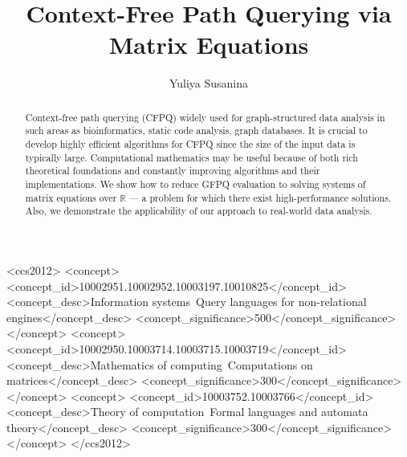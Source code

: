 \documentclass[sigconf]{acmart}
\begin{document}
\fancyhead{}

\title{Context-Free Path Querying via Matrix Equations}

\author{Yuliya Susanina}





\begin{abstract}
  Context-free path querying (CFPQ) widely used for graph-structured data analysis in such areas as bioinformatics, static code analysis, graph databases.
  It is crucial to develop highly efficient algorithms for CFPQ since the size of the input data is typically large.
  Computational mathematics may be useful because of both rich theoretical foundations and constantly improving algorithms and their implementations.
  We show how to reduce GFPQ evaluation to solving systems of matrix equations over $\mathbb{R}$ --- a problem for which there exist high-performance solutions.
  Also, we demonstrate the applicability of our approach to real-world data analysis.
\end{abstract}

\begin{CCSXML}
<ccs2012>
<concept>
<concept_id>10002951.10002952.10003197.10010825</concept_id>
<concept_desc>Information systems~Query languages for non-relational engines</concept_desc>
<concept_significance>500</concept_significance>
</concept>
<concept>
<concept_id>10002950.10003714.10003715.10003719</concept_id>
<concept_desc>Mathematics of computing~Computations on matrices</concept_desc>
<concept_significance>300</concept_significance>
</concept>
<concept>
<concept_id>10003752.10003766</concept_id>
<concept_desc>Theory of computation~Formal languages and automata theory</concept_desc>
<concept_significance>300</concept_significance>
</concept>
</ccs2012>
\end{CCSXML}
\end{document}
